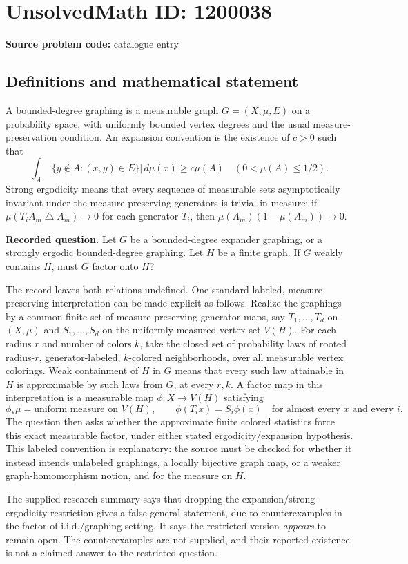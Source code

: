 \documentclass[11pt]{article}
\begin{document}
\section*{UnsolvedMath ID: 1200038}
\textbf{Source problem code:} catalogue entry
\subsection{Definitions and mathematical statement}
A bounded-degree graphing is a measurable graph $G=(X,\mu,E)$ on a probability space, with uniformly bounded vertex degrees and the usual measure-preservation condition. An expansion convention is the existence of $c>0$ such that
\[
 \int_A |\{y\notin A:(x,y)\in E\}|\,d\mu(x)\geq c\mu(A)
 \quad(0<\mu(A)\leq1/2).
\]
Strong ergodicity means that every sequence of measurable sets asymptotically invariant under the measure-preserving generators is trivial in measure: if $\mu(T_iA_m\mathbin{\triangle}A_m)\to0$ for each generator $T_i$, then $\mu(A_m)(1-\mu(A_m))\to0$.

\textbf{Recorded question.} Let $G$ be a bounded-degree expander graphing, or a strongly ergodic bounded-degree graphing. Let $H$ be a finite graph. If $G$ weakly contains $H$, must $G$ factor onto $H$?

The record leaves both relations undefined. One standard labeled, measure-preserving interpretation can be made explicit as follows. Realize the graphings by a common finite set of measure-preserving generator maps, say $T_1,\ldots,T_d$ on $(X,\mu)$ and $S_1,\ldots,S_d$ on the uniformly measured vertex set $V(H)$. For each radius $r$ and number of colors $k$, take the closed set of probability laws of rooted radius-$r$, generator-labeled, $k$-colored neighborhoods, over all measurable vertex colorings. Weak containment of $H$ in $G$ means that every such law attainable in $H$ is approximable by such laws from $G$, at every $r,k$. A factor map in this interpretation is a measurable map $\phi:X\to V(H)$ satisfying
\[
 \phi_*\mu=\text{uniform measure on }V(H),\qquad
 \phi(T_i x)=S_i\phi(x)\quad\text{for almost every }x\text{ and every }i.
\]
The question then asks whether the approximate finite colored statistics force this exact measurable factor, under either stated ergodicity/expansion hypothesis. This labeled convention is explanatory: the source must be checked for whether it instead intends unlabeled graphings, a locally bijective graph map, or a weaker graph-homomorphism notion, and for the measure on $H$.

The supplied research summary says that dropping the expansion/strong-ergodicity restriction gives a false general statement, due to counterexamples in the factor-of-i.i.d./graphing setting. It says the restricted version \emph{appears} to remain open. The counterexamples are not supplied, and their reported existence is not a claimed answer to the restricted question.
\end{document}
